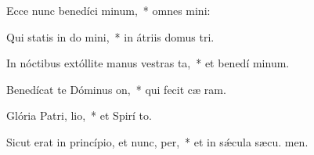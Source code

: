 \item Ecce nunc benedíci minum,~* omnes  mini:
\item Qui statis in do mini,~* in átriis domus  tri.
\item In nóctibus extóllite manus vestras  ta,~* et benedí minum.
\item Benedícat te Dóminus  on,~* qui fecit cæ  ram.
\item Glória Patri,  lio,~* et Spirí to.
\item Sicut erat in princípio, et nunc,  per,~* et in sǽcula sæcu. men.
